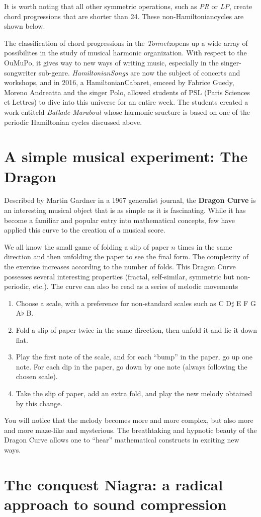 \documentclass{article}
\newcommand{\Tonnetz}{\emph{Tonnetz}}
\newcommand{\Hamiltonian}{Hamiltonian}
\begin{document}
It is worth noting that all other symmetric operations, such as \emph{PR} or
\emph{LP}, create chord progressions that are shorter than 24.  These
non-\Hamiltonian cycles are shown below.

The classification of chord progressions in the \Tonnetz opens up a wide
array of possibilites in the study of musical harmonic organization.  With
respect to the OuMuPo, it gives way to new ways of writing music, especially
in the singer-songwriter sub-genre.  \emph{\Hamiltonian Songs} are now the
subject of concerts and workshops, and in 2016, a \Hamiltonian Cabaret,
emceed by Fabrice Guedy, Moreno Andreatta and the singer Polo, allowed
students of PSL (Paris Sciences et Lettres) to dive into this universe for
an entire week.  The students created a work entiteld \emph{Ballade-Marabout}
whose harmonic sructure is based on one of the periodic Hamiltonian cycles
discussed above.

\section*{A simple musical experiment: The Dragon}
Described by Martin Gardner in a 1967 generalist journal, the \textbf{Dragon
Curve} is an interesting musical object that is as simple as it is
fascinating.  While it has become a familiar and popular entry into
mathematical concepts, few have applied this curve to the creation of a
musical score.

We all know the small game of folding a slip of paper $n$ times in the same
direction and then unfolding the paper to see the final form.  The
complexity of the exercise increases according to the number of folds.  This
Dragon Curve possesses several interesting properties (fractal,
self-similar, symmetric but non-periodic, etc.).  The curve can also be read
as a series of melodic movements
\begin{enumerate}
\item Choose a scale, with a preference for non-standard scales such as C
D$\sharp$ E F G A$\flat$ B.
\item Fold a slip of paper twice in the same direction, then unfold it and
lie it down flat.
\item Play the first note of the scale, and for each ``bump'' in the paper,
go up one note.  For each dip in the paper, go down by one note (always
following the chosen scale).
\item Take the slip of paper, add an extra fold, and play the new melody
obtained by this change.
\end{enumerate}
You will notice that the melody becomes more and more complex, but also more
and more maze-like and mysterious.  The breathtaking and hypnotic beauty of
the Dragon Curve allows one to ``hear'' mathematical constructs in exciting
new ways.
\section*{The conquest Niagra: a radical approach to sound compression}
\end{document}
